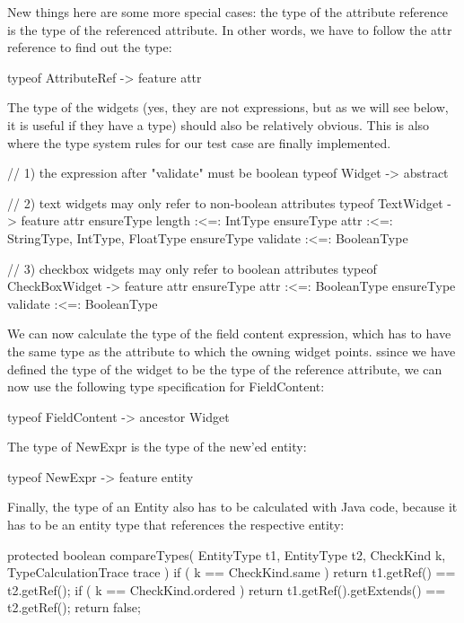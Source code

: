 New things here are some more special cases: the type of the attribute reference
is the type of the referenced attribute. In other words, we have to follow the 
attr reference to find out the type:

\begin{code}
     typeof AttributeRef -> feature attr
\end{code}

The type of the widgets (yes,  they are not expressions, but as we will see
below, it is useful if they have a type) should also be relatively obvious. This
is also where  the type system rules for our  test case are  finally
implemented.

\begin{code}
    // 1) the expression after "validate" must be boolean
    typeof Widget -> abstract
    
    // 2) text widgets may only refer to non-boolean attributes 
    typeof TextWidget -> feature attr {
        ensureType length :<=: IntType
        ensureType attr :<=: StringType, IntType, FloatType
        ensureType validate :<=: BooleanType
    }  
    
    // 3) checkbox widgets may only refer to boolean attributes
    typeof CheckBoxWidget -> feature attr {
        ensureType attr :<=: BooleanType
        ensureType validate :<=: BooleanType
    }
\end{code}


We can now calculate the type of the field content expression, which has to have
the same type as  the attribute to which the owning widget points. ssince we
have defined the type of the widget to be the type of the reference attribute,
we can now use the following type specification for FieldContent:

\begin{code}
    typeof FieldContent -> ancestor Widget
\end{code}

The type of NewExpr is the type of the new'ed entity:

\begin{code}
    typeof NewExpr -> feature entity
\end{code} 

Finally, the type of an Entity also has to be calculated with Java code, because
it has to be an entity type that references the respective entity:

\begin{code}
    protected boolean compareTypes( EntityType t1, EntityType t2, CheckKind k, TypeCalculationTrace trace ) {
        if ( k == CheckKind.same ) return t1.getRef() == t2.getRef();
        if ( k == CheckKind.ordered ) return t1.getRef().getExtends() == t2.getRef();
        return false;
    }
\end{code}



